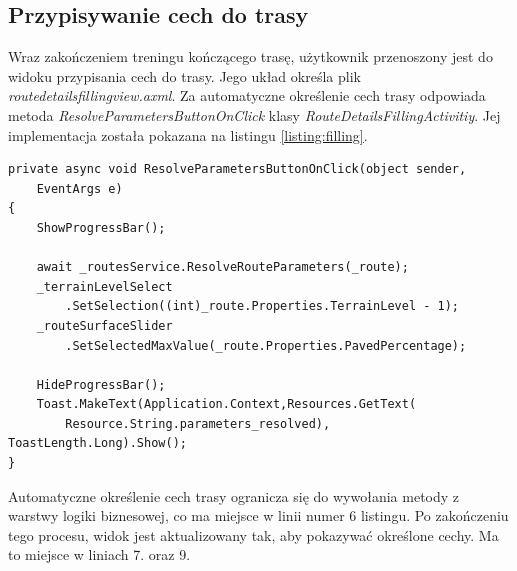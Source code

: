\subsection{Przypisywanie cech do trasy}
Wraz zakończeniem treningu kończącego trasę, użytkownik przenoszony jest do widoku przypisania cech do trasy. Jego układ określa plik \textit{route\textunderscore details\textunderscore filling\textunderscore view.axml}. Za automatyczne określenie cech trasy odpowiada metoda \textit{ResolveParametersButtonOnClick} klasy \textit{RouteDetailsFillingActivitiy}. Jej implementacja została pokazana na listingu \ref{listing:filling}.
\begin{lstlisting}[caption={Wywołanie procesu automatycznego przypisania cech trasy},label=listing:filling]
private async void ResolveParametersButtonOnClick(object sender,
	EventArgs e)
{
    ShowProgressBar();

    await _routesService.ResolveRouteParameters(_route);
    _terrainLevelSelect
    	.SetSelection((int)_route.Properties.TerrainLevel - 1);
    _routeSurfaceSlider
    	.SetSelectedMaxValue(_route.Properties.PavedPercentage);

    HideProgressBar();
    Toast.MakeText(Application.Context,Resources.GetText(
    	Resource.String.parameters_resolved), ToastLength.Long).Show();
}
\end{lstlisting}
Automatyczne określenie cech trasy ogranicza się do wywołania metody z warstwy logiki biznesowej, co ma miejsce w linii numer 6 listingu. Po zakończeniu tego procesu, widok jest aktualizowany tak, aby pokazywać określone cechy. Ma to miejsce w liniach 7. oraz 9.

